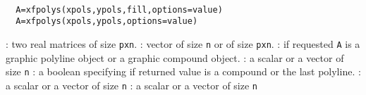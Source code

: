 
\begin{mandesc}
  \\ %
\end{mandesc}
\begin{calling_sequence}
\begin{verbatim}
  A=xfpolys(xpols,ypols,fill,options=value)
  A=xfpolys(xpols,ypols,options=value)
\end{verbatim}
\end{calling_sequence}

\begin{parameters}
  \begin{varlist}
    : two real matrices of size \verb!pxn!.
    : vector of size \verb!n! or of size \verb!pxn!.
    : if requested \verb!A! is a graphic polyline object or a graphic compound object.
    : a scalar or a vector of size \verb!n!
    : a boolean  specifying if returned value is a compound or the last polyline.
    : a scalar or a vector of size \verb!n!
    :  a scalar or a vector of size \verb!n!
  \end{varlist}
\end{parameters}

